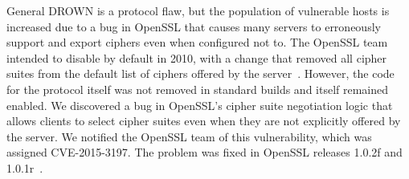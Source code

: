 General DROWN is a protocol flaw, but the population of vulnerable hosts is
increased due to a bug in OpenSSL that causes many servers to erroneously
support \ssltwo and export ciphers even when configured not to. The OpenSSL
team intended to disable \ssltwo by default in 2010, with a change that removed
all \ssltwo cipher suites from the default list of ciphers offered by the
server~\cite{opensslchangelog}.  However, the code for the protocol itself was
not removed in standard builds and \ssltwo itself remained enabled. We
discovered a bug in OpenSSL's \ssltwo cipher suite negotiation logic that
allows clients to select \ssltwo cipher suites even when they are not
explicitly offered by the server. We notified the OpenSSL team of this
vulnerability, which was assigned CVE-2015-3197.  The problem was fixed in
OpenSSL releases 1.0.2f and 1.0.1r~\cite{opensslchangelog}.
